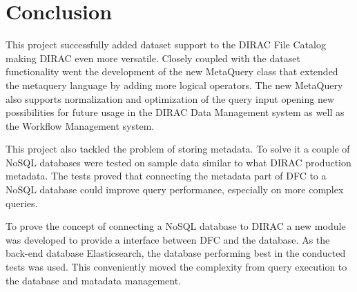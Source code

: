 \chapter*{Conclusion}

This project successfully added dataset support to the DIRAC File Catalog making DIRAC even more 
versatile. Closely coupled with the dataset functionality went the development of the new MetaQuery
class that extended the metaquery language by adding more logical operators. The new MetaQuery also
supports normalization and optimization of the query input opening new possibilities for future usage
in the DIRAC Data Management system as well as the Workflow Management system. 

This project also tackled the problem of storing metadata. To solve it a couple of NoSQL databases were tested
on sample data similar to what DIRAC production metadata. The tests proved that connecting the 
metadata part of DFC to a NoSQL database could improve query performance, especially on more complex
queries. 

To prove the concept of connecting a NoSQL database to DIRAC a new module was developed to provide 
a interface between DFC and the database. As the back-end database Elasticsearch, the database performing 
best in the conducted tests was used. This conveniently moved the complexity from query execution to the database 
and matadata management.